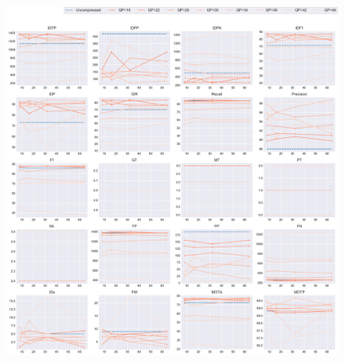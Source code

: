 \begin{figure}[!htbp]
\centering
\includegraphics[width=1.0\linewidth]{img/appendix/BlowingBubbles_all_multiplots_msr.pdf}
\caption[Result of all object classes in Class D BlowingBubbles with Horizontal Axis of MSR]{}
\label{fig:BlowingBubbles_all_msr}
\end{figure}



